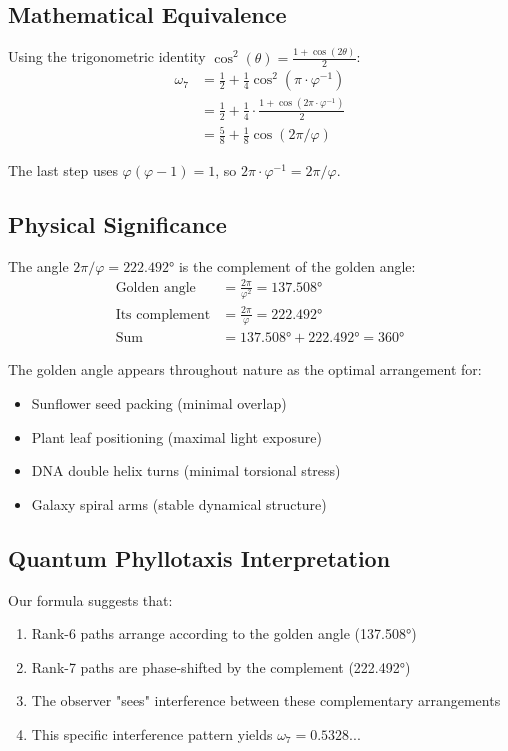 \documentclass[%
 reprint,
 amsmath,amssymb,
 aps,
 prd,
 10pt,
 nofootinbib,      %
 longbibliography  %
]{revtex4-2}
\theoremstyle{definition}
\theoremstyle{remark}
\begin{document}
\subsection{Mathematical Equivalence}

Using the trigonometric identity $\cos^2(\theta) = \frac{1 + \cos(2\theta)}{2}$:
\begin{align}
\omega_7 &= \frac{1}{2} + \frac{1}{4}\cos^2(\pi \cdot \varphi^{-1}) \\
&= \frac{1}{2} + \frac{1}{4} \cdot \frac{1 + \cos(2\pi \cdot \varphi^{-1})}{2} \\
&= \frac{5}{8} + \frac{1}{8}\cos(2\pi/\varphi)
\end{align}

The last step uses $\varphi(\varphi - 1) = 1$, so $2\pi \cdot \varphi^{-1} = 2\pi/\varphi$.

\subsection{Physical Significance}

The angle $2\pi/\varphi = 222.492°$ is the complement of the golden angle:
\begin{align}
\text{Golden angle} &= \frac{2\pi}{\varphi^2} = 137.508° \\
\text{Its complement} &= \frac{2\pi}{\varphi} = 222.492° \\
\text{Sum} &= 137.508° + 222.492° = 360°
\end{align}

The golden angle appears throughout nature as the optimal arrangement for:
\begin{itemize}
\item Sunflower seed packing (minimal overlap)
\item Plant leaf positioning (maximal light exposure)
\item DNA double helix turns (minimal torsional stress)
\item Galaxy spiral arms (stable dynamical structure)
\end{itemize}

\subsection{Quantum Phyllotaxis Interpretation}

Our formula suggests that:
\begin{enumerate}
\item Rank-6 paths arrange according to the golden angle (137.508°)
\item Rank-7 paths are phase-shifted by the complement (222.492°)
\item The observer "sees" interference between these complementary arrangements
\item This specific interference pattern yields $\omega_7 = 0.5328...$
\end{enumerate}
\end{document}
